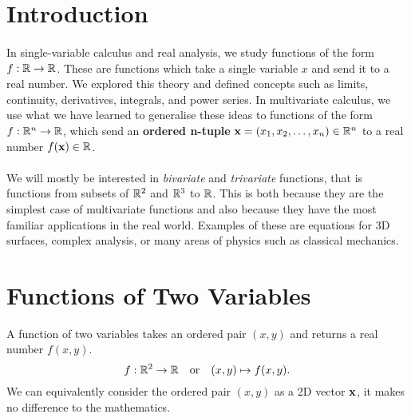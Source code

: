 \documentclass[../multivariate_calculus.tex]{subfiles}
\begin{document}
    \section{Introduction}
        \paragraph{}
        In single-variable calculus and real analysis, we study functions of the form $f:\mathbb{R}\to\mathbb{R}$.
        These are functions which take a single variable $x$ and send it to a real number.
        We explored this theory and defined concepts such as limits, continuity, derivatives, integrals, and power series.
        In multivariate calculus, we use what we have learned to generalise these ideas to functions of the form $f:\mathbb{R}^n\to\mathbb{R}$, which send an \textbf{ordered n-tuple} $\mathbf{x}=(x_1,x_2,\dots,x_n)\in\mathbb{R}^n$ to a real number $f(\mathbf{x})\in\mathbb{R}$.

        \paragraph{}
        We will mostly be interested in \textit{bivariate} and \textit{trivariate} functions, that is functions from subsets of $\mathbb{R}^2$ and $\mathbb{R}^3$ to $\mathbb{R}$.
        This is both because they are the simplest case of multivariate functions and also because they have the most familiar applications in the real world.
        Examples of these are equations for 3D surfaces, complex analysis, or many areas of physics such as classical mechanics.

    \section{Functions of Two Variables}
        \begin{definition}
            A function of two variables takes an ordered pair $(x,y)$ and returns a real number $f(x,y)$.
            \begin{equation}
                f:\mathbb{R}^2\to\mathbb{R}\quad\text{or}\quad(x,y)\mapsto f(x,y).
            \end{equation}
            We can equivalently consider the ordered pair $(x,y)$ as a 2D vector $\mathbf{x}$, it makes no difference to the mathematics.
        \end{definition}
\end{document}
